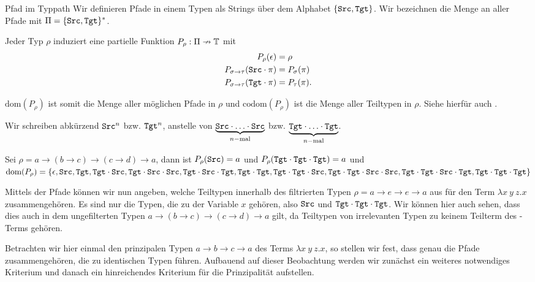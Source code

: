 \begin{definition}{Pfad im Typ}{path}
 Wir definieren Pfade in einem Typen als Strings über dem Alphabet $\{\texttt{Src},\texttt{Tgt}\}$. Wir bezeichnen die Menge an aller Pfade mit $\Pi = \{\texttt{Src},\texttt{Tgt}\}^*$.
 
 Jeder Typ $\rho$ induziert eine partielle Funktion $P_\rho : \Pi \nrightarrow \mathbb{T}$ mit
 \begin{align*}
 P_\rho(\epsilon) &= \rho\\
 P_{\sigma\to\tau}(\texttt{Src}\cdot\pi) &= P_\sigma(\pi)\\
 P_{\sigma\to\tau}(\texttt{Tgt}\cdot\pi) &= P_\tau(\pi).
 \end{align*}
 
 $\text{dom}(P_\rho)$ ist somit die Menge aller möglichen Pfade in $\rho$ und $\text{codom}(P_\rho)$ ist die Menge aller Teiltypen in $\rho$. Siehe hierfür auch .
 \end{definition}
\begin{notation}
    Wir schreiben abkürzend $\texttt{Src}^n$ bzw. $\texttt{Tgt}^n$, anstelle von $\underbrace{\texttt{Src}\cdot\ldots\cdot\texttt{Src}}_{n-\text{mal}}$ bzw. $\underbrace{\texttt{Tgt}\cdot\ldots\cdot\texttt{Tgt}}_{n-\text{mal}}$.
\end{notation}
\begin{example}{}{}
    Sei $\rho = a \to (b\to c)\to (c\to d)\to a$, dann ist $P_\rho(\texttt{Src}) = a$ und $P_\rho(\texttt{Tgt}\cdot\texttt{Tgt}\cdot\texttt{Tgt}) = a$ und $\text{dom}(P_\rho)=\{\epsilon, \texttt{Src}, \texttt{Tgt}, \texttt{Tgt}\cdot\texttt{Src},\texttt{Tgt}\cdot\texttt{Src}\cdot\texttt{Src}, \texttt{Tgt}\cdot\texttt{Src}\cdot\texttt{Tgt}, \texttt{Tgt}\cdot\texttt{Tgt}, \texttt{Tgt}\cdot\texttt{Tgt}\cdot\texttt{Src}, \texttt{Tgt}\cdot\texttt{Tgt}\cdot\texttt{Src}\cdot\texttt{Src}, \texttt{Tgt}\cdot\texttt{Tgt}\cdot\texttt{Src}\cdot\texttt{Tgt}, \texttt{Tgt}\cdot\texttt{Tgt}\cdot\texttt{Tgt}\}$
\end{example}

Mittels der Pfade können wir nun angeben, welche Teiltypen innerhalb des filtrierten Typen $\rho=a\to e\to e \to a$ aus  für den Term $\lambda x~y~z.x$ zusammengehören. Es sind nur die Typen, die zu der Variable $x$ gehören, also $\texttt{Src}$ und $\texttt{Tgt}\cdot\texttt{Tgt}\cdot\texttt{Tgt}$. Wir können hier auch sehen, dass dies auch in dem ungefilterten Typen $a\to(b\to c)\to (c\to d)\to a$ gilt, da Teiltypen von irrelevanten Typen zu keinem Teilterm des \tlambda-Terms gehören.

Betrachten wir hier einmal den prinzipalen Typen $a\to b\to c\to a$ des Terms $\lambda x~y~z.x$, so stellen wir fest, dass genau die Pfade zusammengehören, die zu identischen Typen führen. Aufbauend auf dieser Beobachtung werden wir zunächst ein weiteres notwendiges Kriterium und danach ein hinreichendes Kriterium für die Prinzipalität aufstellen.

